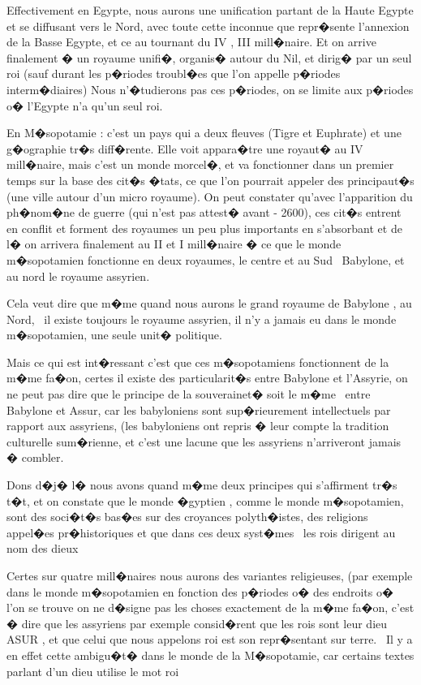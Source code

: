 \documentclass{article}
\begin{document}
\bigskip

Effectivement en Egypte, nous aurons une unification partant de la Haute Egypte et se diffusant vers le Nord, avec toute cette inconnue que repr�sente l'annexion de la Basse Egypte, et ce au tournant du IV , III mill�naire. Et on arrive finalement � un royaume unifi�, organis� autour du Nil, et dirig� par un seul roi (sauf durant les p�riodes troubl�es que l'on appelle p�riodes interm�diaires) Nous n'�tudierons pas ces p�riodes, on se limite aux p�riodes o� l'Egypte n'a qu'un seul roi.


\bigskip

En M�sopotamie : c'est un pays qui a deux fleuves (Tigre et Euphrate) et une g�ographie tr�s diff�rente. Elle voit appara�tre une royaut� au IV mill�naire, mais c'est un monde morcel�, et va fonctionner dans un premier temps sur la base des cit�s �tats, ce que l'on pourrait appeler des principaut�s (une ville autour d'un micro royaume). On peut constater qu'avec l'apparition du ph�nom�ne de guerre (qui n'est pas attest� avant - 2600), ces cit�s entrent en conflit et forment des royaumes un peu plus importants en s'absorbant et de l� on arrivera finalement au II et I mill�naire � ce que le monde m�sopotamien fonctionne en deux royaumes, le centre et au Sud \ Babylone, et au nord le royaume assyrien.

Cela veut dire que m�me quand nous aurons le grand royaume de Babylone , au Nord, \ il existe toujours le royaume assyrien, il n'y a jamais eu dans le monde m�sopotamien, une seule unit� politique.


\bigskip

Mais ce qui est int�ressant c'est que ces m�sopotamiens fonctionnent de la m�me fa�on, certes il existe des particularit�s entre Babylone et l'Assyrie, on ne peut pas dire que le principe de la souverainet� soit le m�me \ entre Babylone et Assur, car les babyloniens sont sup�rieurement intellectuels par rapport aux assyriens, (les babyloniens ont repris � leur compte la tradition culturelle sum�rienne, et c'est une lacune que les assyriens n'arriveront jamais � combler.


\bigskip

Dons d�j� l� nous avons quand m�me deux principes qui s'affirment tr�s t�t, et on constate que le monde �gyptien , comme le monde m�sopotamien, sont des soci�t�s bas�es sur des croyances polyth�istes, des religions appel�es pr�historiques et que dans ces deux syst�mes \ les rois dirigent au nom des dieux

Certes sur quatre mill�naires nous aurons des variantes religieuses, (par exemple dans le monde m�sopotamien en fonction des p�riodes o� des endroits o� l'on se trouve on ne d�signe pas les choses exactement de la m�me fa�on, c'est � dire que les assyriens par exemple consid�rent que les rois sont leur dieu ASUR , et que celui que nous appelons roi est son repr�sentant sur terre. \ Il y a en effet cette ambigu�t� dans le monde de la M�sopotamie, car certains textes parlant d'un dieu utilise le mot roi
\end{document}
